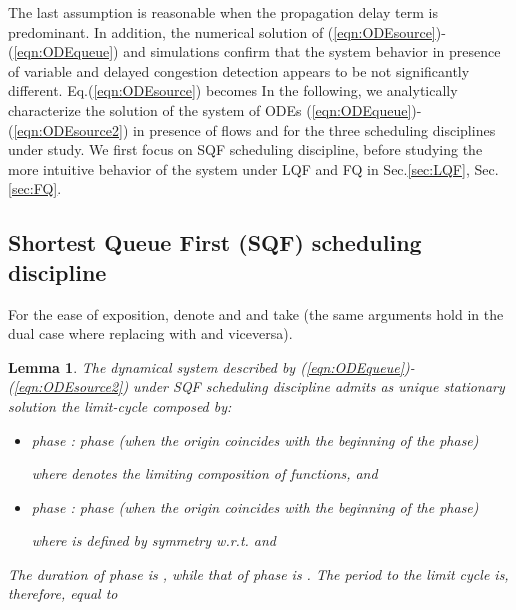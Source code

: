 \documentclass[a4paper,oneside, 11pt]{article}
\newtheorem{lem}[theorem]{Lemma}
\begin{document}
The last assumption is reasonable when the propagation delay term is predominant.
In addition, the numerical solution of (\ref{eqn:ODEsource})-(\ref{eqn:ODEqueue}) and
 simulations confirm that the system behavior in presence of variable  and
delayed congestion detection appears to be not significantly different.
Eq.(\ref{eqn:ODEsource}) becomes
In the following, we analytically characterize the solution of the system of ODEs
(\ref{eqn:ODEqueue})-(\ref{eqn:ODEsource2}) in presence of  flows and
for the three scheduling disciplines under study. We first focus on SQF scheduling
discipline, before
studying the more intuitive behavior of the system under LQF and FQ in Sec.\ref{sec:LQF}, Sec.\ref{sec:FQ}.
\subsection{Shortest Queue First (SQF) scheduling discipline}\label{sec:SQF}
For the ease of exposition, denote  and  and take  (the same arguments hold in the dual case  where replacing  with  and viceversa).
\begin{lem}
 The dynamical system described by (\ref{eqn:ODEqueue})-(\ref{eqn:ODEsource2}) under SQF scheduling discipline admits as unique stationary solution the limit-cycle composed by:\begin{itemize}
 \item \textit{phase  }:
  phase  (when  the origin coincides with the beginning of the phase)

where  denotes the limiting composition of  functions,
 and

 \item \textit{phase }:
  phase  (when  the origin coincides with the beginning of the phase)

where  is defined by symmetry w.r.t.  and

\end{itemize}
The duration of phase  is , while that of phase  is .
The period to the limit cycle is, therefore, equal to\\

\end{lem}
\end{document}
